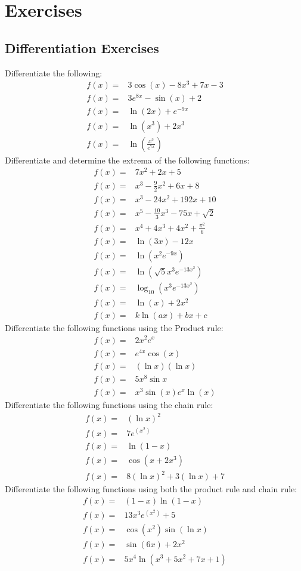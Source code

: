 \documentclass[main.tex]{subfiles}
\begin{document}
\section{Exercises}
\subsection{Differentiation Exercises}
Differentiate the following:
\begin{align}
f(x) =& 3 \cos(x)-8x^3+7x-3\\
f(x) =& 3e^{8x}-\sin(x)+2\\
f(x) =& \ln(2x) + e^{-9x}\\
f(x) =& \ln(x^3)+2x^3\\
f(x) =& \ln\left(\frac{x^3}{e^{7x}}\right)
\end{align}
Differentiate and determine the extrema of the following functions:
\begin{align}
f(x) =& 7x^2+2x+5\\
f(x) =& x^3-\frac{9}{2}x^2+6x+8\\
f(x) =& x^3-24x^2+192x+10\\
f(x) =& x^5-\frac{10}{3}x^3-75x+\sqrt{2}\\
f(x) =& x^4+4x^3+4x^2+\frac{\pi^2}{6}\\
f(x) =& \ln(3x)-12x\\
f(x) =& \ln(x^2e^{-9x})\\
f(x) =& \ln(\sqrt{5}x^3e^{-13x^2})\\
f(x) =& \log_{10}(x^3e^{-13x^2})\\
f(x) =& \ln(x) + 2x^2\\
f(x) =& k\ln(ax) + bx+c
\end{align}
Differentiate the following functions using the Product rule:
\begin{align}
f(x) =& 2x^2e^x\\
f(x) =& e^{4x}\cos(x)\\
f(x) =& (\ln{x})(\ln{x})\\
f(x) =& 5x^8\sin{x}\\
f(x) =& x^3\sin{(x)}e^x\ln{(x)}
\end{align}
Differentiate the following functions using the chain rule:
\begin{align}
f(x) =& (\ln{x})^2\\
f(x) =& 7e^{(x^2)}\\
f(x) =& \ln{(1-x)}\\
f(x) =& \cos{(x+2x^3)}\\
f(x) =& 8(\ln{x})^2 + 3 (\ln{x}) + 7
\end{align}
Differentiate the following functions using both the product rule and chain rule:
\begin{align}
f(x) =& (1-x)\ln{(1-x)}\\
f(x) =& 13x^3e^{(x^2)} + 5\\
f(x) =& \cos{(x^2)}\sin{(\ln{x})}\\
f(x) =& \sin{(6x)} + 2x^2\\
f(x) =& 5x^4\ln{(x^3 + 5x^2 + 7x + 1)}
\end{align}
\end{document}
